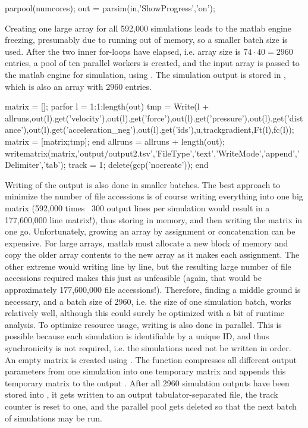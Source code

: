 \bigskip
\begin{python}
	parpool(numcores);
	out = parsim(in,'ShowProgress','on');
\end{python}
\bigskip

\noindent
Creating one large array for all 592,000 simulations leads to the matlab engine freezing, presumably due to running out of memory, so a smaller batch size is used. After the two inner for-loops have elapsed, i.e. array size is $74 \cdot 40 = 2960$ entries, a pool of ten parallel workers is created, and the input array is passed to the matlab engine for simulation, using . The simulation output is stored in , which is also an array with 2960 entries.

\bigskip
\begin{python}
	matrix = [];
	parfor l = 1:1:length(out)
		tmp = Write(l + allruns,out(l).get('velocity'),out(l).get('force'),out(l).get('pressure'),out(l).get('distance'),out(l).get('acceleration_neg'),out(l).get('ids'),u,trackgradient,Ft(l),fc(l));
		matrix = [matrix;tmp];
	end
	allruns = allruns + length(out);
	writematrix(matrix,'output/output2.tsv','FileType','text','WriteMode','append','Delimiter','tab');
	track = 1;
	delete(gcp('nocreate'));
end
\end{python}
\bigskip

\noindent
Writing of the output is also done in smaller batches. The best approach to minimize the number of file accessions is of course writing everything into one big matrix (592,000 times ~300 output lines per simulation would result in a 177,600,000 line matrix!), thus storing in memory, and then writing the matrix in one go. Unfortunately, growing an array by assignment or concatenation can be expensive. For large arrays, matlab must allocate a new block of memory and copy the older array contents to the new array as it makes each assignment. The other extreme would writing line by line, but the resulting large number of file accessions required makes this just as unfeasible (again, that would be approximately 177,600,000 file accessions!). Therefore, finding a middle ground is necessary, and a batch size of 2960, i.e. the size of one simulation batch, works relatively well, although this could surely be optimized with a bit of runtime analysis. To optimize resource usage, writing is also done in parallel. This is possible because each simulation is identifiable by a unique ID, and thus synchronicity is not required, i.e. the simulations need not be written in order. An empty matrix is created using . The  function compresses all different output parameters from one simulation into one temporary matrix  and appends this temporary matrix to the output . After all 2960 simulation outputs have been stored into , it gets written to an output tabulator-separated file, the track counter is reset to one, and the parallel pool gets deleted so that the next batch of simulations may be run.

